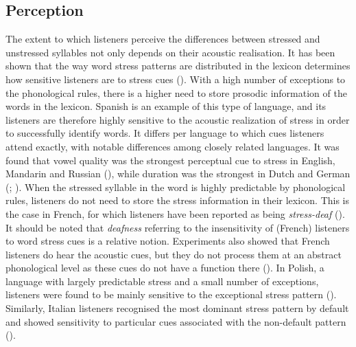 \subsection{Perception} \label{sec512}
The extent to which listeners perceive the differences between stressed and unstressed syllables not only depends on their acoustic realisation. It has been shown that the way word stress patterns are distributed in the lexicon determines how sensitive listeners are to stress cues (\citealt{peperkamp_perception_2010}). With a high number of exceptions to the phonological rules, there is a higher need to store prosodic information of the words in the lexicon. Spanish is an example of this type of language, and its listeners are therefore highly sensitive to the acoustic realization of stress in order to successfully identify words. It differs per language to which cues listeners attend exactly, with notable differences among closely related languages. It was found that vowel quality was the strongest perceptual cue to stress in English, Mandarin and Russian (\citealt{chrabaszcz_acoustic_2014}), while duration was the strongest in Dutch and German (\citealt{sluijter_spectral_1997}; \citealt{mengel_deutscher_2000}). When the stressed syllable in the word is highly predictable by phonological rules, listeners do not need to store the stress information in their lexicon. This is the case in French, for which listeners have been reported as being \textit{stress-deaf} (\citealt{dupoux_destressing_1997}). It should be noted that \textit{deafness} referring to the insensitivity of (French) listeners to word stress cues is a relative notion. Experiments also showed that French listeners do hear the acoustic cues, but they do not process them at an abstract phonological level as these cues do not have a function there (\citealt{dupoux_destressing_1997}). In Polish, a language with largely predictable stress and a small number of exceptions, listeners were found to be mainly sensitive to the exceptional stress pattern (\citealt{domahs_stress_2012}). Similarly, Italian listeners recognised the most dominant stress pattern by default and showed sensitivity to particular cues associated with the non-default pattern (\citealt{sulpizio_italians_2012}).

